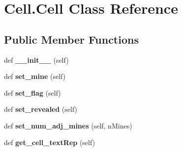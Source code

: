 \hypertarget{class_cell_1_1_cell}{}\section{Cell.\+Cell Class Reference}
\label{class_cell_1_1_cell}
\subsection*{Public Member Functions}
\begin{DoxyCompactItemize}
\item 
\mbox{\label{class_cell_1_1_cell_a2507e24b7fd159b949e0eae9c4f26f64}} 
def {\bfseries \+\_\+\+\_\+init\+\_\+\+\_\+} (self)
\item 
\mbox{\label{class_cell_1_1_cell_ac79f4595ce241a92297768dbc5aad4dc}} 
def {\bfseries set\+\_\+mine} (self)
\item 
\mbox{\label{class_cell_1_1_cell_ac0a083ab6a33c3a1886134a1fc1369ef}} 
def {\bfseries set\+\_\+flag} (self)
\item 
\mbox{\label{class_cell_1_1_cell_a3edb2b41e0679a26da351daeaf6c20ed}} 
def {\bfseries set\+\_\+revealed} (self)
\item 
\mbox{\label{class_cell_1_1_cell_acb977a068cd459ae068fcc35e1b4a879}} 
def {\bfseries set\+\_\+num\+\_\+adj\+\_\+mines} (self, n\+Mines)
\item 
\mbox{\label{class_cell_1_1_cell_a0565862f2b86fb47e48f9d814bd52f7b}} 
def {\bfseries get\+\_\+cell\+\_\+text\+Rep} (self)
\end{DoxyCompactItemize}
